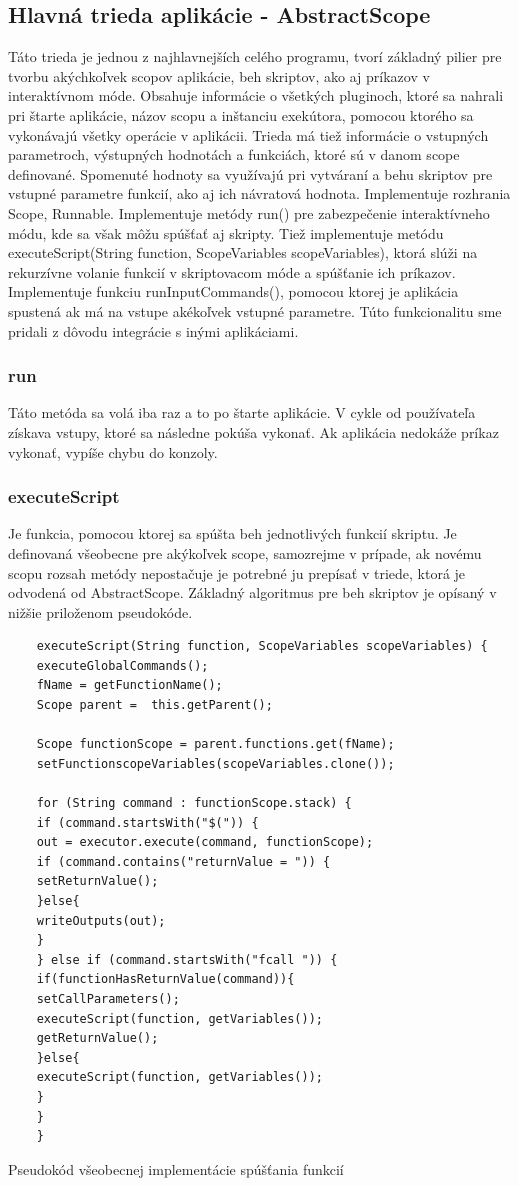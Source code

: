 \subsection{Hlavná trieda aplikácie - AbstractScope}
Táto trieda je jednou z najhlavnejších celého programu, tvorí základný pilier pre tvorbu akýchkoľvek scopov aplikácie, beh skriptov, ako aj príkazov v interaktívnom móde. Obsahuje informácie o všetkých pluginoch, ktoré sa nahrali pri štarte aplikácie, názov scopu a inštanciu exekútora, pomocou ktorého sa vykonávajú všetky operácie v aplikácii. Trieda má tiež informácie o vstupných parametroch, výstupných hodnotách a funkciách, ktoré sú v danom scope definované. Spomenuté hodnoty sa využívajú pri vytváraní a behu skriptov pre vstupné parametre funkcií, ako aj ich návratová hodnota. Implementuje rozhrania Scope, Runnable. Implementuje metódy run() pre zabezpečenie interaktívneho módu, kde sa však môžu spúšťať aj skripty. Tiež implementuje metódu executeScript(String function, ScopeVariables scopeVariables), ktorá slúži na rekurzívne volanie funkcií v skriptovacom móde a spúšťanie ich príkazov.
Implementuje funkciu runInputCommands(), pomocou ktorej je aplikácia spustená ak má na vstupe akékoľvek vstupné parametre. Túto funkcionalitu sme pridali z dôvodu integrácie s inými aplikáciami. 
\subsubsection{run}
\indent Táto metóda sa volá iba raz a to po štarte aplikácie. V cykle od používateľa získava vstupy, ktoré sa následne pokúša vykonať. Ak aplikácia nedokáže príkaz vykonať, vypíše chybu do konzoly.
\subsubsection{executeScript}
\indent Je funkcia, pomocou ktorej sa spúšta beh jednotlivých funkcií skriptu. Je definovaná všeobecne pre akýkoľvek scope, samozrejme v prípade, ak novému scopu rozsah metódy nepostačuje je potrebné ju prepísať v triede, ktorá je odvodená od AbstractScope. Základný algoritmus pre beh skriptov je opísaný v nižšie priloženom pseudokóde.
\begin{algorithm}[H]
	\begin{verbatim}
	executeScript(String function, ScopeVariables scopeVariables) {
	executeGlobalCommands();
	fName = getFunctionName();
	Scope parent =  this.getParent();
	
	Scope functionScope = parent.functions.get(fName);
	setFunctionscopeVariables(scopeVariables.clone());
	
	for (String command : functionScope.stack) {
	if (command.startsWith("$(")) {
	out = executor.execute(command, functionScope);
	if (command.contains("returnValue = ")) {
	setReturnValue();
	}else{
	writeOutputs(out);
	}
	} else if (command.startsWith("fcall ")) {
	if(functionHasReturnValue(command)){
	setCallParameters();
	executeScript(function, getVariables());
	getReturnValue();
	}else{
	executeScript(function, getVariables());
	}
	}
	}
	\end{verbatim}
	\caption{Pseudokód všeobecnej implementácie spúšťania funkcií}
	\label{alg:gen}
\end{algorithm}

